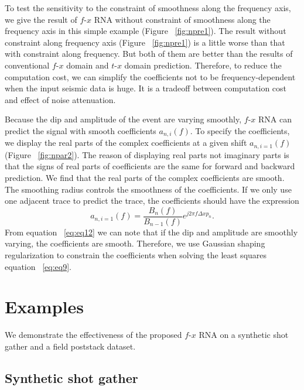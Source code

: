 To test the sensitivity to the constraint of smoothness along the frequency axis, we give the result of $f$-$x$ RNA without constraint of smoothness along the frequency axis in this simple example (Figure ~\ref{fig:npre1}). The result without constraint along frequency axis 
(Figure ~\ref{fig:npre1}) is a little worse than that with constraint along frequency. 
But both of them are better than the results of conventional $f$-$x$ domain and $t$-$x$ domain prediction. 
Therefore, to reduce the computation cost, we can simplify the coefficients not to be frequency-dependent 
when the input seismic data is huge. It is a tradeoff between computation cost and effect of noise attenuation.

Because the dip and amplitude of the event are varying smoothly, $f$-$x$ RNA can predict the signal with smooth 
coefficients ${{a}_{n,i}}(f)$. To specify the coefficients, we display the real parts of the complex 
coefficients at a given shift ${{a}_{n,i=1}}(f)$ (Figure ~\ref{fig:npar2}). The reason of displaying real parts not 
imaginary parts is that the signs of real parts of coefficients are the same for forward and 
backward prediction. We find that the real parts of the complex coefficients are smooth. 
The smoothing radius controls the smoothness of the coefficients. If we only use one adjacent 
trace to predict the trace, the coefficients should have the expression
      \begin{equation} 
          {{a}_{n,i=1}}(f)=\frac{{{B}_{n}}(f)}{{{B}_{n-1}}(f)}{{e}^{j2\pi f\Delta x{{p}_{n}}}}.
        \label{eq:eq12}
      \end{equation} 
From equation ~\ref{eq:eq12} we can note that if the dip and amplitude are smoothly varying, 
the coefficients are smooth. Therefore, we use Gaussian shaping regularization to constrain 
the coefficients when solving the least squares equation ~\ref{eq:eq9}.

\section{Examples}

We demonstrate the effectiveness of the proposed $f$-$x$ RNA on a synthetic shot gather and a field poststack dataset. 

\subsection{Synthetic shot gather}


